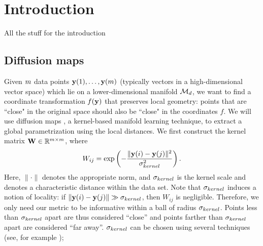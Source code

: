 
\chapter{Introduction\label{ch:intro}}

All the stuff for the introduction

\section{Diffusion maps} \label{sec:dmaps}

Given $m$ data points $\mathbf{y}(1), \dots, \mathbf{y}(m)$ (typically vectors in a high-dimensional vector space) which lie on a lower-dimensional manifold $\mathcal{M}_d$, we want to find a coordinate transformation $f(\mathbf{y})$ that preserves local geometry: points that are ``close" in the original space should also be ``close" in the coordinates $f$.
%
%
We will use diffusion maps \cite{Coifman2006, coifman2005geometric}, a kernel-based manifold learning technique, to extract a global parametrization using the local distances.
%
We first construct the kernel matrix $\mathbf{W} \in \mathbb{R}^{m \times m}$, where
\begin{equation} \label{eq:dmaps_kernel}
W_{ij} = \exp \left( -\frac{\|\mathbf{y}(i) - \mathbf{y}(j) \|^2}{\sigma_{kernel}^2} \right).
\end{equation}
Here, $\| \cdot \|$ denotes the appropriate norm, and $\sigma_{kernel}$ is the kernel scale
and denotes a characteristic distance within the data set.
%
Note that $\sigma_{kernel}$ induces a notion of locality: if $\|\mathbf{y}(i) - \mathbf{y}(j) \| \gg \sigma_{kernel}$, then $W_{ij}$ is negligible.
%
Therefore, we only need our metric to be informative within a ball of radius $\sigma_{kernel}$.
%
Points less than $\sigma_{kernel}$ apart are thus considered ``close'' and points farther than $\sigma_{kernel}$ apart are considered ``far away''.
%
$\sigma_{kernel}$ can be chosen using several techniques (see, for example \citep{coifman2008graph, rohrdanz2011determination});

